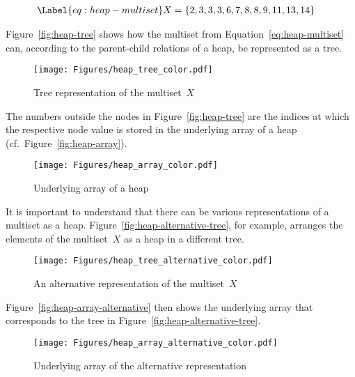 \begin{align}
\Label{eq:heap-multiset}
  X &= \{2,3,3,3,6,7,8,8,9,11,13,14\}
\end{align}

\clearpage

Figure~\ref{fig:heap-tree} shows how the multiset from Equation~\eqref{eq:heap-multiset} 
can, according to the parent-child relations of a heap, be represented as a tree.

\begin{figure}[hbt]
\centering
\texttt{[image: Figures/heap\_tree\_color.pdf]}
\caption{Tree representation of the multiset~$X$}
\end{figure}

\FloatBarrier

The numbers outside the nodes in Figure~\ref{fig:heap-tree} are the indices at which
the respective node value is stored in the underlying array of a heap (cf.\ Figure~\ref{fig:heap-array}).

\begin{figure}[hbt]
\centering
\texttt{[image: Figures/heap\_array\_color.pdf]}
\caption{Underlying array of a heap}
\end{figure}

\FloatBarrier
\clearpage

It is important to understand that there can be various representations of a multiset
as a heap.
Figure~\ref{fig:heap-alternative-tree}, for example, arranges the elements of
the multiset~$X$ as a heap in a different tree.

\begin{figure}[hbt]
\centering
\texttt{[image: Figures/heap\_tree\_alternative\_color.pdf]}
\caption{ An alternative representation of the multiset~$X$}
\end{figure}

\FloatBarrier

Figure~\ref{fig:heap-array-alternative} then shows the underlying array that 
corresponds to the tree in Figure~\ref{fig:heap-alternative-tree}.

\begin{figure}[hbt]
\centering
\texttt{[image: Figures/heap\_array\_alternative\_color.pdf]}
\caption{Underlying array of the alternative representation}
\end{figure}

\FloatBarrier
\clearpage

